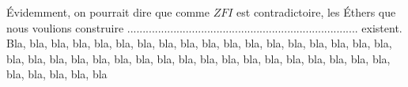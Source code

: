 \documentclass[10pt,a4paper]{article}
\begin{document}
	\noindent \'{E}videmment, on pourrait dire que comme $ZFI$ est contradictoire,
	les \'{E}thers que nous voulions construire  ........................................................................... 
	existent. Bla, bla, bla, bla, bla, bla, bla, bla, bla, bla, bla, bla,
	bla, bla, bla, bla, bla, bla, bla, bla, bla, bla, bla, bla, bla, bla, bla, bla, bla, bla, bla,
	bla, bla, bla, bla, bla, bla, bla, bla, bla, bla
\end{document}
